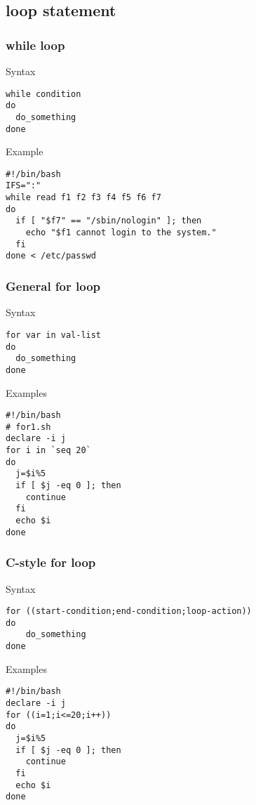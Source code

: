 \documentclass[red]{beamer}
\begin{document}
\begin{CJK*}{UTF8}{gbsn}
\subsection{loop statement}

\begin{frame}
\frametitle{while loop}
\begin{block}{\centering Syntax}
\begin{lstlisting}
while condition
do
  do_something
done
\end{lstlisting}
\end{block}
\begin{block}{Example}
\begin{lstlisting}
#!/bin/bash
IFS=":"
while read f1 f2 f3 f4 f5 f6 f7
do
  if [ "$f7" == "/sbin/nologin" ]; then
    echo "$f1 cannot login to the system."
  fi
done < /etc/passwd
\end{lstlisting}
\end{block}
\end{frame}


\begin{frame}
\frametitle{General for loop}
\begin{block}{\centering Syntax}
\begin{lstlisting}
for var in val-list
do
  do_something
done
\end{lstlisting}
\end{block}
\begin{block}{\centering Examples}
\begin{lstlisting}
#!/bin/bash
# for1.sh
declare -i j
for i in `seq 20`
do
  j=$i%5
  if [ $j -eq 0 ]; then
    continue
  fi
  echo $i
done
\end{lstlisting}
\end{block}
\end{frame}

\begin{frame}
\frametitle{C-style for loop}
\begin{block}{\centering Syntax}
\begin{lstlisting}
for ((start-condition;end-condition;loop-action))
do
	do_something
done
\end{lstlisting}
\end{block}
\begin{block}{\centering Examples}
\begin{lstlisting}
#!/bin/bash
declare -i j
for ((i=1;i<=20;i++))
do
  j=$i%5
  if [ $j -eq 0 ]; then
    continue
  fi
  echo $i
done
\end{lstlisting}
\end{block}
\end{frame}



\end{CJK*}
\end{document}
